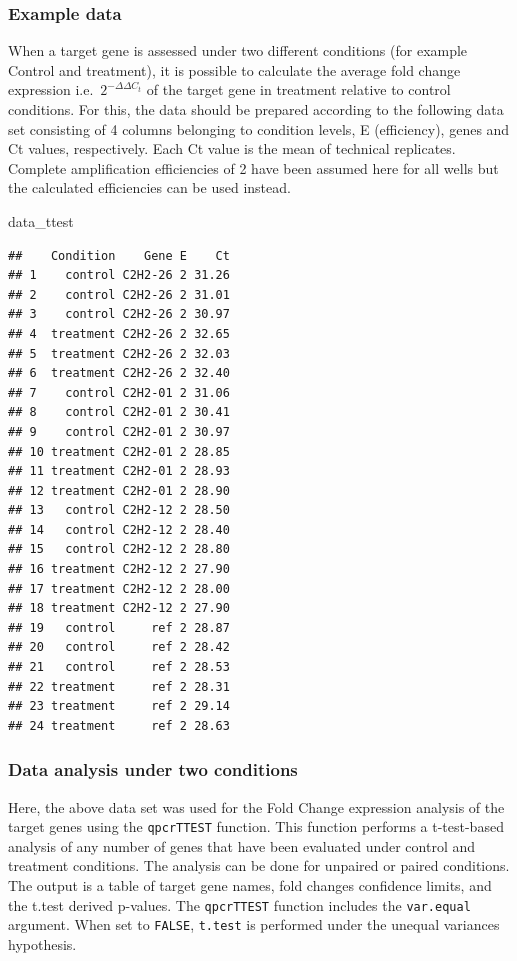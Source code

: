 \documentclass[
]{article}
\newenvironment{Shaded}{\begin{snugshade}}{\end{snugshade}}
\newcommand{\NormalTok}[1]{#1}
\begin{document}
\hypertarget{example-data}{%
\subsubsection{Example data}\label{example-data}}

When a target gene is assessed under two different conditions (for
example Control and treatment), it is possible to calculate the average
fold change expression i.e.~\(2^{-\Delta \Delta C_t}\) of the target
gene in treatment relative to control conditions. For this, the data
should be prepared according to the following data set consisting of 4
columns belonging to condition levels, E (efficiency), genes and Ct
values, respectively. Each Ct value is the mean of technical replicates.
Complete amplification efficiencies of 2 have been assumed here for all
wells but the calculated efficiencies can be used instead.

\begin{Shaded}
\begin{Highlighting}[]
\NormalTok{data\_ttest}
\end{Highlighting}
\end{Shaded}

\begin{verbatim}
##    Condition    Gene E    Ct
## 1    control C2H2-26 2 31.26
## 2    control C2H2-26 2 31.01
## 3    control C2H2-26 2 30.97
## 4  treatment C2H2-26 2 32.65
## 5  treatment C2H2-26 2 32.03
## 6  treatment C2H2-26 2 32.40
## 7    control C2H2-01 2 31.06
## 8    control C2H2-01 2 30.41
## 9    control C2H2-01 2 30.97
## 10 treatment C2H2-01 2 28.85
## 11 treatment C2H2-01 2 28.93
## 12 treatment C2H2-01 2 28.90
## 13   control C2H2-12 2 28.50
## 14   control C2H2-12 2 28.40
## 15   control C2H2-12 2 28.80
## 16 treatment C2H2-12 2 27.90
## 17 treatment C2H2-12 2 28.00
## 18 treatment C2H2-12 2 27.90
## 19   control     ref 2 28.87
## 20   control     ref 2 28.42
## 21   control     ref 2 28.53
## 22 treatment     ref 2 28.31
## 23 treatment     ref 2 29.14
## 24 treatment     ref 2 28.63
\end{verbatim}

\hypertarget{data-analysis-under-two-conditions}{%
\subsubsection{Data analysis under two
conditions}\label{data-analysis-under-two-conditions}}

Here, the above data set was used for the Fold Change expression
analysis of the target genes using the \texttt{qpcrTTEST} function. This
function performs a t-test-based analysis of any number of genes that
have been evaluated under control and treatment conditions. The analysis
can be done for unpaired or paired conditions. The output is a table of
target gene names, fold changes confidence limits, and the t.test
derived p-values. The \texttt{qpcrTTEST} function includes the
\texttt{var.equal} argument. When set to \texttt{FALSE}, \texttt{t.test}
is performed under the unequal variances hypothesis.
\end{document}
